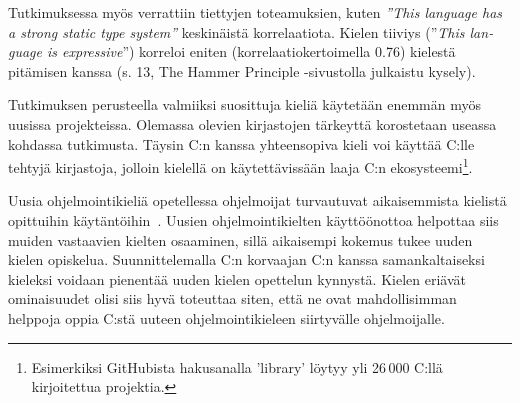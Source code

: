 Tutkimuksessa myös verrattiin tiettyjen toteamuksien, kuten
\emph{''\foreignlanguage{english}{This language has a strong static type
system}''} keskinäistä korrelaatiota. Kielen tiiviys
(''\emph{\foreignlanguage{english}{This language is expressive}}'') korreloi
eniten (korrelaatiokertoimella 0.76) kielestä pitämisen kanssa (s. 13, The
Hammer Principle -sivustolla julkaistu kysely).


Tutkimuksen perusteella valmiiksi suosittuja kieliä käytetään enemmän myös
uusissa projekteissa. Olemassa olevien kirjastojen tärkeyttä korostetaan
useassa kohdassa tutkimusta. Täysin C:n kanssa yhteensopiva kieli voi käyttää
C:lle tehtyjä kirjastoja, jolloin kielellä on käytettävissään laaja C:n
ekosysteemi\footnote{Esimerkiksi GitHubista hakusanalla 'library' löytyy yli
26\,000 C:llä kirjoitettua projektia.}.

Uusia ohjelmointikieliä opetellessa ohjelmoijat turvautuvat aikaisemmista
kielistä opittuihin käytäntöihin~\citep{languagelearning}. Uusien
ohjelmointikielten käyttöönottoa helpottaa siis muiden vastaavien kielten
osaaminen, sillä aikaisempi kokemus tukee uuden kielen opiskelua.
Suunnittelemalla C:n korvaajan C:n kanssa samankaltaiseksi kieleksi voidaan
pienentää uuden kielen opettelun kynnystä. Kielen eriävät ominaisuudet olisi
siis hyvä toteuttaa siten, että ne ovat mahdollisimman helppoja oppia C:stä
uuteen ohjelmointikieleen siirtyvälle ohjelmoijalle.


